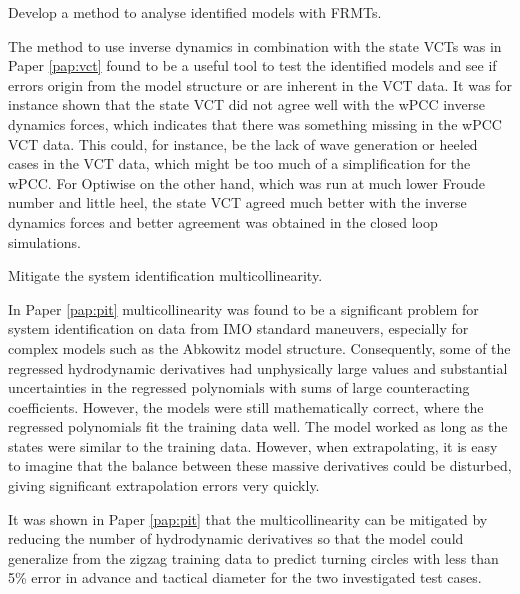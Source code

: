 \begin{tcolorbox}[sharp corners,title=RO3]
Develop a method to analyse identified models with FRMTs.
\end{tcolorbox}
The method to use inverse dynamics in combination with the state VCTs was in Paper \ref{pap:vct} found to be a useful tool to test the identified models and see if errors origin from the model structure or are inherent in the VCT data. It was for instance shown that the state VCT did not agree well with the wPCC inverse dynamics forces, which indicates that there was something missing in the wPCC VCT data. This could, for instance, be the lack of wave generation or heeled cases in the VCT data, which might be too much of a simplification for the wPCC. For Optiwise on the other hand, which was run at much lower Froude number and little heel, the state VCT agreed much better with the inverse dynamics forces and better agreement was obtained in the closed loop simulations.

\begin{tcolorbox}[sharp corners,title=RO4]
Mitigate the system identification multicollinearity.
\end{tcolorbox}
In Paper \ref{pap:pit} multicollinearity was found to be a significant problem for system identification on data from IMO standard maneuvers, especially for complex models such as the Abkowitz model structure. Consequently, some of the regressed hydrodynamic derivatives had unphysically large values and substantial uncertainties in the regressed polynomials with sums of large counteracting coefficients. However, the models were still mathematically correct, where the regressed polynomials fit the training data well. The model worked as long as the states were similar to the training data. However, when extrapolating, it is easy to imagine that the balance between these massive derivatives could be disturbed, giving significant extrapolation errors very quickly.


It was shown in Paper \ref{pap:pit} that the multicollinearity can be mitigated by reducing the number of hydrodynamic derivatives so that the model could generalize from the zigzag training data to predict turning circles with less than 5\% error in advance and tactical diameter for the two investigated test cases.

